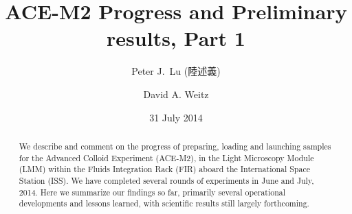 \documentclass[
twocolumn,
rmp,aps,10pt]{revtex4-1}
\begin{document}
\begin{CJK*}{UTF8}{}

\title{ACE-M2 Progress and Preliminary results, Part 1}
\author{Peter J.~Lu (陸述義)}
\author{David A. Weitz}

\date{31 July 2014}
\begin{abstract}
We describe and comment on the progress of preparing, loading and launching
samples for the Advanced Colloid Experiment (ACE-M2), in the Light Microscopy
Module (LMM) within the Fluids Integration Rack (FIR) aboard the International
Space Station (ISS). We have completed several rounds of experiments in June and July,
2014. Here we summarize our findings so far, primarily several operational
developments and lessons learned, with scientific results still largely
forthcoming.
\end{abstract}
\maketitle
\end{CJK*}

\tableofcontents

\clearpage












\end{document}
